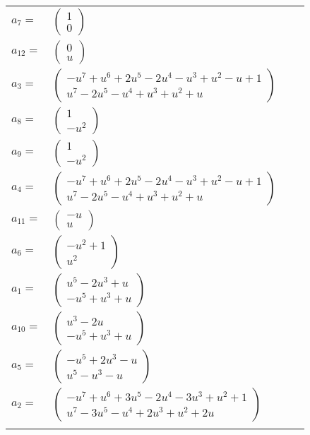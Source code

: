 \documentclass[1p]{elsarticle_modified}
\theoremstyle{definition}
\begin{document}
\begin{tabular}{m{7pt} m{180pt} m{7pt} m{180pt} }
\flushright $a_{7}=$&$\begin{pmatrix}1\\0\end{pmatrix}$ \\
\flushright $a_{12}=$&$\begin{pmatrix}0\\u\end{pmatrix}$ \\
\flushright $a_{3}=$&$\begin{pmatrix}- u^7+u^6+2 u^5-2 u^4- u^3+u^2- u+1\\u^7-2 u^5- u^4+u^3+u^2+u\end{pmatrix}$ \\
\flushright $a_{8}=$&$\begin{pmatrix}1\\- u^2\end{pmatrix}$ \\
\flushright $a_{9}=$&$\begin{pmatrix}1\\- u^2\end{pmatrix}$ \\
\flushright $a_{4}=$&$\begin{pmatrix}- u^7+u^6+2 u^5-2 u^4- u^3+u^2- u+1\\u^7-2 u^5- u^4+u^3+u^2+u\end{pmatrix}$ \\
\flushright $a_{11}=$&$\begin{pmatrix}- u\\u\end{pmatrix}$ \\
\flushright $a_{6}=$&$\begin{pmatrix}- u^2+1\\u^2\end{pmatrix}$ \\
\flushright $a_{1}=$&$\begin{pmatrix}u^5-2 u^3+u\\- u^5+u^3+u\end{pmatrix}$ \\
\flushright $a_{10}=$&$\begin{pmatrix}u^3-2 u\\- u^5+u^3+u\end{pmatrix}$ \\
\flushright $a_{5}=$&$\begin{pmatrix}- u^5+2 u^3- u\\u^5- u^3- u\end{pmatrix}$ \\
\flushright $a_{2}=$&$\begin{pmatrix}- u^7+u^6+3 u^5-2 u^4-3 u^3+u^2+1\\u^7-3 u^5- u^4+2 u^3+u^2+2 u\end{pmatrix}$\\&\end{tabular}
\end{document}
